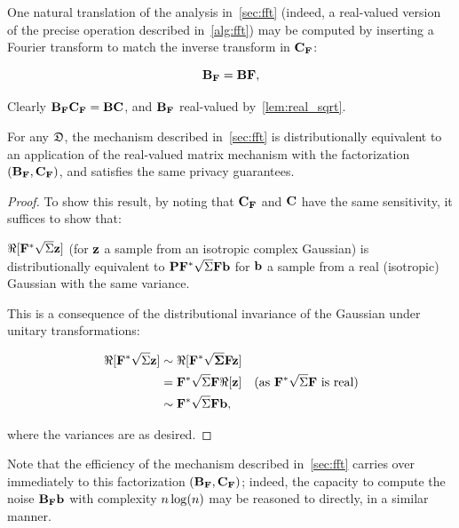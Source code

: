 
One natural translation of the analysis in~\cref{sec:fft} (indeed, a real-valued version of the precise operation described in~\cref{alg:fft}) may be computed by inserting a Fourier transform to match the inverse transform in $\mathbf{C}_{\mathbf{F}}$:

\[
\mathbf{B}_{\mathbf{F}} = \mathbf{B}\mathbf{F},
\]

Clearly $\mathbf{B}_{\mathbf{F}}\mathbf{C}_{\mathbf{F}} = \mathbf{B}\mathbf{C}$, and $\mathbf{B}_{\mathbf{F}}$ real-valued by~\cref{lem:real_sqrt}.

\begin{prop}
For any $\mathfrak{D}$, the mechanism described in~\cref{sec:fft} is distributionally equivalent to an application of the real-valued matrix mechanism with the factorization $\left(\mathbf{B}_{\mathbf{F}}, \mathbf{C}_{\mathbf{F}}\right)$, and satisfies the same privacy guarantees.
\end{prop}

\begin{proof}
To show this result, by noting that $\mathbf{C}_{\mathbf{F}}$ and $\mathbf{C}$ have the same sensitivity, it suffices to show that:
\begin{center}
 $\Re[\mathbf{F}^* \sqrt{\Sigma} \mathbf{z}]$ (for $\mathbf{z}$ a sample from an isotropic complex Gaussian) is distributionally equivalent to $\mathbf{P}\mathbf{F}^* \sqrt{\Sigma} \mathbf{F} \mathbf{b}$ for $\mathbf{b}$ a sample from a real (isotropic) Gaussian with the same variance.
\end{center}

This is a consequence of the distributional invariance of the Gaussian under unitary transformations:

\begin{align*}
\Re[\mathbf{F}^* \sqrt{\Sigma} \mathbf{z}] &\sim \Re[\bf\mathbf{F}^* \sqrt{\Sigma} \mathbf{F} \mathbf{z}] \\
&= \mathbf{F}^* \sqrt{\Sigma} \mathbf{F} \Re[\mathbf{z}] \quad \text {(as } \mathbf{F}^* \sqrt{\Sigma} \mathbf{F} \text{ is real)}\\
&\sim \mathbf{F}^* \sqrt{\Sigma} \mathbf{F} \mathbf{b},
\end{align*}

where the variances are as desired.
\end{proof}

Note that the efficiency of the mechanism described in~\cref{sec:fft} carries over immediately to this factorization $\left(\mathbf{B}_{\mathbf{F}}, \mathbf{C}_{\mathbf{F}}\right)$; indeed, the capacity to compute the noise $\mathbf{B}_{\mathbf{F}} \mathbf{b}$ with complexity $n\log(n)$ may be reasoned to directly, in a similar manner.

